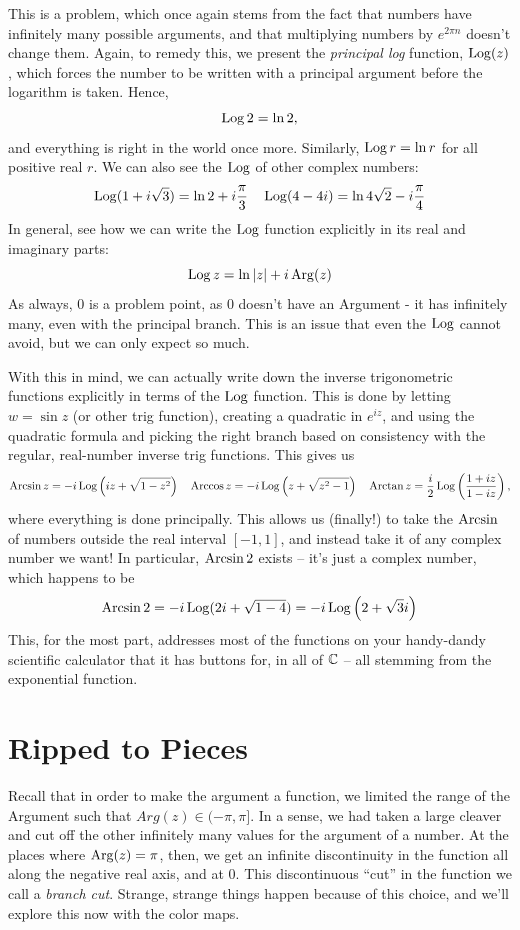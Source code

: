 This is a problem, which once again stems from the fact that numbers have infinitely many possible arguments, and that multiplying numbers by $e^{2\pi n}$ doesn't change them. Again, to remedy this, we present the \textit{principal log} function, $\operatorname*{Log} (z)$, which forces the number to be written with a principal argument before the logarithm is taken. Hence,
\[
    \operatorname*{Log} 2 = \ln 2,
\]
and everything is right in the world once more. Similarly, $\operatorname*{Log} r = \ln r$ for all positive real $r$. We can also see the $\operatorname*{Log}$ of other complex numbers:
\[
    \operatorname*{Log} (1 + i \sqrt{3}) = \ln 2 + i \frac{\pi}{3} \quad \operatorname*{Log}(4  - 4i) = \ln 4 \sqrt{2} - i \frac{\pi}{4}
\]
In general, see how we can write the $\operatorname*{Log}$ function explicitly in its real and imaginary parts:
\[
    \operatorname*{Log} z = \ln |z| + i \operatorname*{Arg}(z)
\]
As always, 0 is a problem point, as 0 doesn't have an Argument - it has infinitely many, even with the principal branch. This is an issue that even the $\operatorname*{Log}$ cannot avoid, but we can only expect so much.

With this in mind, we can actually write down the inverse trigonometric functions explicitly in terms of the $\operatorname*{Log}$ function. This is done by letting $w = \sin z$ (or other trig function), creating a quadratic in $e^{iz}$, and using the quadratic formula and picking the right branch based on consistency with the regular, real-number inverse trig functions. This gives us
\[
    \operatorname{Arcsin} z = -i \operatorname*{Log}\left(iz + \sqrt{1-z^2}\right) \quad \operatorname{Arccos} z = -i \operatorname*{Log}\left(z + \sqrt{z^2 -1}\right) \quad \operatorname{Arctan} z = \frac{i}{2} \operatorname*{Log}\left( \frac{1+iz}{1-iz}\right),
\]
where everything is done principally. This allows us (finally!) to take the $\operatorname{Arcsin}$ of numbers outside the real interval $[-1, 1]$, and instead take it of any complex number we want! In particular, $\operatorname{Arcsin} 2$ exists -- it's just a complex number, which happens to be
\[
    \operatorname{Arcsin} 2 = -i \operatorname*{Log}(2i + \sqrt{1-4}) = -i \operatorname*{Log}\left(2+\sqrt{3}i\right)
\]
This, for the most part, addresses most of the functions on your handy-dandy scientific calculator that it has buttons for, in all of $\mathbb C$ -- all stemming from the exponential function.
\section{Ripped to Pieces}

Recall that in order to make the argument a function, we limited the range of the Argument such that $Arg(z) \in (-\pi, \pi]$. In a sense, we had taken a large cleaver and cut off the other infinitely many values for the argument of a number. At the places where $\operatorname*{Arg}(z) = \pi$, then, we get an infinite discontinuity in the function all along the negative real axis, and at 0. This discontinuous ``cut'' in the function we call a \textit{branch cut}. Strange, strange things happen because of this choice, and we'll explore this now with the color maps.

